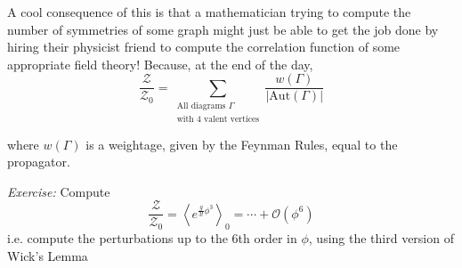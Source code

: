 \documentclass{article}
\newcommand{\cO}{\mathcal{O}}
\newcommand{\cZ}{\mathcal{Z}}
\newcommand{\mean}[1]{\left\langle #1 \right\rangle}
\begin{document}
\vskip 0.5cm
A cool consequence of this is that a mathematician trying to compute the number of symmetries of some graph might just be able to get the job done by hiring their physicist friend to compute the correlation function of some appropriate field theory! Because, at the end of the day, 
\[ \frac{\cZ}{\cZ_0} = \sum_{\substack{\text{All diagrams } \Gamma \\ \text{with 4 valent vertices}}} \frac{w(\Gamma)}{\left| \text{Aut}(\Gamma) \right|} \]

where $w(\Gamma)$ is a weightage, given by the Feynman Rules, equal to the propagator.

\vskip 0.5cm
\begin{dottedbox}
  \emph{Exercise:} Compute 
  \[ \frac{\cZ}{\cZ_0} = \mean{e^{\frac{g}{3!} \phi^3}}_0 = \cdots + \cO(\phi^6) \]
  i.e. compute the perturbations up to the 6th order in $\phi$, using the third version of Wick's Lemma 
\end{dottedbox}
\end{document}
